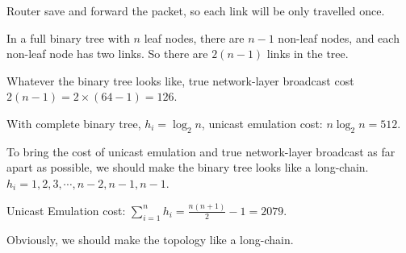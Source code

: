 \begin{enumerate}
\begin{enumerate}
	    Router save and forward the packet, so each link will be only travelled once.
	    
	    In a full binary tree with $n$ leaf nodes, there are $n - 1$ non-leaf nodes, and each non-leaf node has two links. So there are $2(n - 1)$ links in the tree.
	    
	    Whatever the binary tree looks like, true network-layer broadcast cost $2(n - 1) = 2 \times (64 - 1) = 126$.
	    
	\end{enumerate}
	
	With complete binary tree, $h_i = \log_{2}{n}$, unicast emulation cost: $n\log_{2}{n} = 512$.

	To bring the cost of unicast emulation and true network-layer broadcast as far apart as possible, we should make the binary tree looks like a long-chain. $h_i = 1, 2, 3, \cdots, n - 2, n - 1, n - 1$.
	
	Unicast Emulation cost: $\sum_{i=1}^{n}{h_i} = \frac{n (n + 1)}{2} - 1 = 2079$.
	
	Obviously, we should make the topology like a long-chain.
	
\end{enumerate}